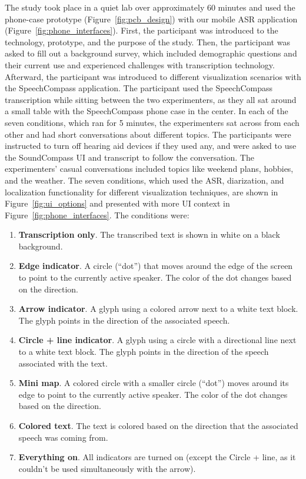 The study took place in a quiet lab over approximately 60 minutes and used the phone-case prototype (Figure~\ref{fig:pcb_design}) with our mobile ASR application (Figure~\ref{fig:phone_interfaces}). First, the participant was introduced to the technology, prototype, and the purpose of the study. Then, the participant was asked to fill out a background survey, which included demographic questions and their current use and experienced challenges with transcription technology. Afterward, the participant was introduced to different visualization scenarios with the SpeechCompass application. The participant used the SpeechCompass transcription while sitting between the two experimenters, as they all sat around a small table with the SpeechCompass phone case in the center. In each of the seven conditions, which ran for 5 minutes, the experimenters sat across from each other and had short conversations about different topics. The participants were instructed to turn off hearing aid devices if they used any, and were asked to use the SoundCompass UI and transcript to follow the conversation. The experimenters' casual conversations included topics like weekend plans, hobbies, and the weather. The seven conditions, which used the ASR, diarization, and localization functionality for different visualization techniques, are shown in Figure~\ref{fig:ui_options} and presented with more UI context in Figure~\ref{fig:phone_interfaces}. The conditions were:
\begin{enumerate}
    \item \textbf{Transcription only}. The transcribed text is shown in white on a black background. 
    
    \item \textbf{Edge indicator}. A circle (``dot'') that moves around the edge of the screen to point to the currently active speaker. The color of the dot changes based on the direction. 
    
    \item \textbf{Arrow indicator}. A glyph using a colored arrow next to a white text block. The glyph points in the direction of the associated speech. 
    
    \item \textbf{Circle + line indicator}. A glyph using a circle with a directional line next to a white text block. The glyph points in the direction of the speech associated with the text. 
    
    \item \textbf{Mini map}. A colored circle with a smaller circle (``dot'') moves around its edge to point to the currently active speaker. The color of the dot changes based on the direction. 
    
    \item \textbf{Colored text}. The text is colored based on the direction that the associated speech was coming from. 
    
    \item \textbf{Everything on}. All indicators are turned on (except the Circle + line, as it couldn't be used simultaneously with the arrow). 
\end{enumerate}

